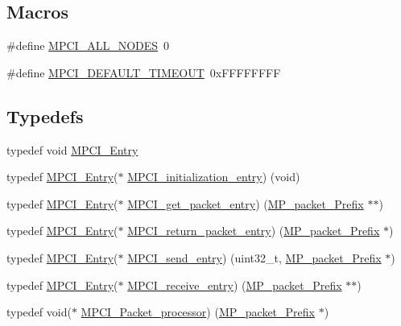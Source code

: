 \subsection*{Macros}
\begin{DoxyCompactItemize}
\item 
\#define \mbox{\hyperlink{group__RTEMSScoreMPCI_ga4dc053d46dbd83064840e1166276ece9}{M\+P\+C\+I\+\_\+\+A\+L\+L\+\_\+\+N\+O\+D\+ES}}~0
\item 
\#define \mbox{\hyperlink{group__RTEMSScoreMPCI_ga0827bfc7e7f590734da1315634b3b8d2}{M\+P\+C\+I\+\_\+\+D\+E\+F\+A\+U\+L\+T\+\_\+\+T\+I\+M\+E\+O\+UT}}~0x\+F\+F\+F\+F\+F\+F\+FF
\end{DoxyCompactItemize}
\subsection*{Typedefs}
\begin{DoxyCompactItemize}
\item 
typedef void \mbox{\hyperlink{group__RTEMSScoreMPCI_ga110fdd671fbc411706e2b281c1685816}{M\+P\+C\+I\+\_\+\+Entry}}
\item 
typedef \mbox{\hyperlink{group__RTEMSScoreMPCI_ga110fdd671fbc411706e2b281c1685816}{M\+P\+C\+I\+\_\+\+Entry}}($\ast$ \mbox{\hyperlink{group__RTEMSScoreMPCI_ga40ecc89f5ace847ed93f57e06ef0f27c}{M\+P\+C\+I\+\_\+initialization\+\_\+entry}}) (void)
\item 
typedef \mbox{\hyperlink{group__RTEMSScoreMPCI_ga110fdd671fbc411706e2b281c1685816}{M\+P\+C\+I\+\_\+\+Entry}}($\ast$ \mbox{\hyperlink{group__RTEMSScoreMPCI_gaff830d8b635714b2f669bfe612744244}{M\+P\+C\+I\+\_\+get\+\_\+packet\+\_\+entry}}) (\mbox{\hyperlink{structMP__packet__Prefix}{M\+P\+\_\+packet\+\_\+\+Prefix}} $\ast$$\ast$)
\item 
typedef \mbox{\hyperlink{group__RTEMSScoreMPCI_ga110fdd671fbc411706e2b281c1685816}{M\+P\+C\+I\+\_\+\+Entry}}($\ast$ \mbox{\hyperlink{group__RTEMSScoreMPCI_gaa1869d09a5e31b0810c9efda6171ffa4}{M\+P\+C\+I\+\_\+return\+\_\+packet\+\_\+entry}}) (\mbox{\hyperlink{structMP__packet__Prefix}{M\+P\+\_\+packet\+\_\+\+Prefix}} $\ast$)
\item 
typedef \mbox{\hyperlink{group__RTEMSScoreMPCI_ga110fdd671fbc411706e2b281c1685816}{M\+P\+C\+I\+\_\+\+Entry}}($\ast$ \mbox{\hyperlink{group__RTEMSScoreMPCI_gaeacb0c0d07a93283f07abcc5727a23a8}{M\+P\+C\+I\+\_\+send\+\_\+entry}}) (uint32\+\_\+t, \mbox{\hyperlink{structMP__packet__Prefix}{M\+P\+\_\+packet\+\_\+\+Prefix}} $\ast$)
\item 
typedef \mbox{\hyperlink{group__RTEMSScoreMPCI_ga110fdd671fbc411706e2b281c1685816}{M\+P\+C\+I\+\_\+\+Entry}}($\ast$ \mbox{\hyperlink{group__RTEMSScoreMPCI_ga87bfcaa7cd058fd748d6f4b7f530448b}{M\+P\+C\+I\+\_\+receive\+\_\+entry}}) (\mbox{\hyperlink{structMP__packet__Prefix}{M\+P\+\_\+packet\+\_\+\+Prefix}} $\ast$$\ast$)
\item 
typedef void($\ast$ \mbox{\hyperlink{group__RTEMSScoreMPCI_gafc97753e25c76740b182f3e8cdf74cc8}{M\+P\+C\+I\+\_\+\+Packet\+\_\+processor}}) (\mbox{\hyperlink{structMP__packet__Prefix}{M\+P\+\_\+packet\+\_\+\+Prefix}} $\ast$)
\end{DoxyCompactItemize}
